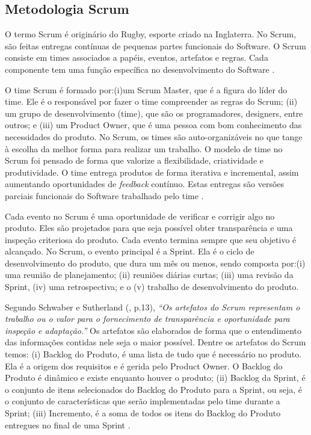 \subsection{Metodologia Scrum}

O termo Scrum  é originário do Rugby, esporte criado na Inglaterra. No Scrum, são feitas entregas contínuas de pequenas partes funcionais do Software. O Scrum consiste em times associados a papéis, eventos, artefatos e regras. Cada componente tem uma função específica no desenvolvimento do Software \cite{schwaber2013}.

O time Scrum é formado por:(i)um Scrum Master, que é a figura do líder do time. Ele é o responsável por fazer o time compreender as regras do Scrum; (ii) um grupo de desenvolvimento (time), que são os programadores, designers, entre outros; e (iii) um Product Owner, que é uma pessoa com bom conhecimento das necessidades do produto. No Scrum, os times são auto-organizáveis no que tange à escolha da melhor forma para realizar um trabalho. O modelo de time no Scrum foi pensado de forma que valorize a flexibilidade, criatividade e produtividade.  O time entrega produtos de forma iterativa e incremental, assim aumentando oportunidades de \textit{feedback} contínuo. Estas entregas são versões parciais funcionais do Software trabalhado pelo time \cite[p. 5-7]{schwaber2013}.

Cada evento no Scrum é uma oportunidade de verificar e corrigir algo no produto. Eles são projetados para que seja possível obter transparência e uma inspeção criteriosa do produto. Cada evento termina sempre que seu objetivo é alcançado. No Scrum, o evento principal é a Sprint. Ela é o ciclo de desenvolvimento do produto, que dura um mês ou menos, sendo composta por:(i) uma reunião de planejamento; (ii) reuniões diárias curtas; (iii) uma revisão da Sprint, (iv) uma retrospectiva; e o  (v) trabalho de desenvolvimento do produto.

Segundo Schwaber e Sutherland (\citeyear{schwaber2013}, p.13), \textit{“Os artefatos do Scrum representam o trabalho ou o valor para o fornecimento de transparência e oportunidade para inspeção e adaptação.”} Os artefatos são elaborados de forma que o entendimento das informações contidas nele seja o maior possível. Dentre os artefatos do Scrum temos: (i) Backlog do Produto, é uma lista de tudo que é necessário no produto. Ela é a origem dos requisitos e é gerida pelo Product Owner. O Backlog do Produto é dinâmico e existe enquanto houver o produto; (ii) Backlog da Sprint, é o conjunto de itens selecionados do Backlog do Produto para a Sprint, ou seja, é o conjunto de características que serão implementadas pelo time durante a Sprint; (iii) Incremento, é a soma de todos os itens do Backlog do Produto entregues no final de uma Sprint \cite[p. 13-15]{schwaber2013}. 


